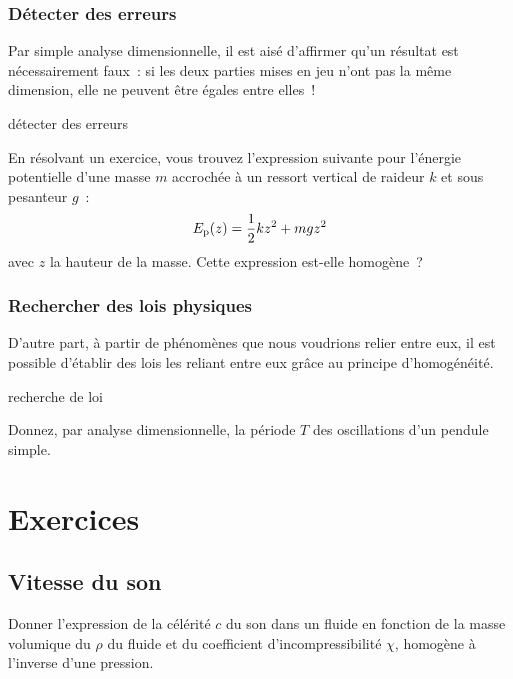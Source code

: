 \documentclass[a4paper, 12pt, final, garamond]{book}
\begin{document}
\subsubsection{Détecter des erreurs}

Par simple analyse dimensionnelle, il est aisé d'affirmer qu'un résultat est
nécessairement faux~: si les deux parties mises en jeu n'ont pas la même
dimension, elle ne peuvent être égales entre elles~!

\begin{exem}[label=exem:homoerr]{détecter des erreurs}

    En résolvant un exercice, vous trouvez l'expression suivante pour l'énergie
    potentielle d'une masse $m$ accrochée à un ressort vertical de raideur $k$
    et sous pesanteur $g$~:
    \[E_{\rm p} (z) = \frac{1}{2}kz^2 + mgz^2\]
    avec $z$ la hauteur de la masse. Cette expression est-elle homogène~?
    \tcblower
    \vspace{6cm}
\end{exem}

\subsubsection{Rechercher des lois physiques}
D'autre part, à partir de phénomènes que nous voudrions relier entre eux, il est
possible d'établir des lois les reliant entre eux grâce au principe
d'homogénéité.

\begin{exem}[label=exem:homoloi]{recherche de loi}

    Donnez, par analyse dimensionnelle, la période $T$ des oscillations d'un
    pendule simple.
    \tcblower
    \vspace{6cm}
\end{exem}

\newpage
\section{Exercices}
\subsection{Vitesse du son}

Donner l'expression de la célérité $c$ du son dans un fluide en fonction de la
masse volumique du $\rho$ du fluide et du coefficient d'incompressibilité
$\chi$, homogène à l'inverse d'une pression.
\end{document}
